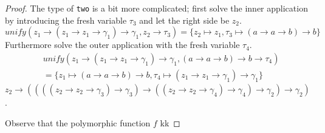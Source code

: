 \documentclass[11pt,oneside,a4paper]{report}
\begin{document}
\begin{proof}
    The type of \texttt{two} is a bit more complicated; first solve the inner application by introducing the fresh variable $\tau_3$ and let the right side be $z_2$.
    \[
        \textit{unify}(z_1 \rightarrow (z_1 \rightarrow z_1 \rightarrow \gamma_1) \rightarrow \gamma_1, z_2 \rightarrow \tau_3) = \{ z_2 \mapsto z_1, \tau_3 \mapsto (a \rightarrow a \rightarrow b) \rightarrow b \}
    \]
    Furthermore solve the outer application with the fresh variable $\tau_4$.
    \begin{align}
        &\textit{unify}(z_1 \rightarrow (z_1 \rightarrow z_1 \rightarrow \gamma_1) \rightarrow \gamma_1, (a \rightarrow a \rightarrow b) \rightarrow b \rightarrow \tau_4)\\
        &= \{ z_1 \mapsto (a \rightarrow a \rightarrow b) \rightarrow b, \tau_4 \mapsto (z_1 \rightarrow z_1 \rightarrow \gamma_1) \rightarrow \gamma_1 \}\tag*{}
    \end{align}
    $z_2 \rightarrow ((((z_2 \rightarrow z_2 \rightarrow \gamma_3) \rightarrow \gamma_3) \rightarrow ((z_2 \rightarrow z_2 \rightarrow \gamma_4) \rightarrow \gamma_4) \rightarrow \gamma_2) \rightarrow \gamma_2)$.

    Observe that the polymorphic function $f$ kk

\end{proof}
\end{document}
